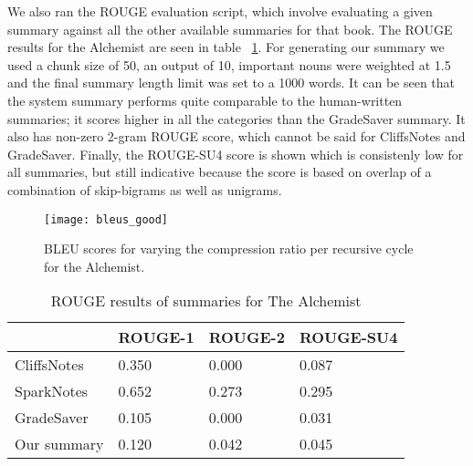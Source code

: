 We also ran the ROUGE evaluation script, which involve evaluating a given summary against all the other available summaries for that book. The ROUGE results for the Alchemist are seen in table ~\ref{tab:rouge-alchemist}. For
generating our summary we used a chunk size of 50, an output of 10, important
nouns were weighted at 1.5 and the final summary length limit was set to a 1000
words. It can be seen that the system summary performs quite comparable to the human-written summaries; it scores higher in all the categories than the GradeSaver summary. It also has non-zero 2-gram ROUGE score, which cannot be said for CliffsNotes and GradeSaver. Finally, the ROUGE-SU4 score is shown which is consistenly low for all summaries, but still indicative because the score is based on overlap of a combination of skip-bigrams as well as unigrams.

\begin{figure}[H]
	\centering
	\texttt{[image: bleus\_good]}
	\caption{BLEU scores for varying the compression ratio per recursive cycle for the Alchemist.}\label{fig:bleus}
\end{figure}

\begin{table}[H]
	\centering
	\caption{ROUGE results of summaries for The Alchemist}\label{tab:rouge-alchemist}
	\begin{tabular}{l l l l}
		\toprule
		\textbf{}   & \textbf{ROUGE-1} & \textbf{ROUGE-2} & \textbf{ROUGE-SU4} \\ \midrule
		CliffsNotes & 0.350           & 0.000           & 0.087 \\ \midrule
		SparkNotes  & 0.652           & 0.273           & 0.295 \\ \midrule
		GradeSaver  & 0.105           & 0.000           & 0.031 \\ \midrule
		Our summary & 0.120           & 0.042           & 0.045 \\
		\bottomrule
	\end{tabular}
\end{table}

